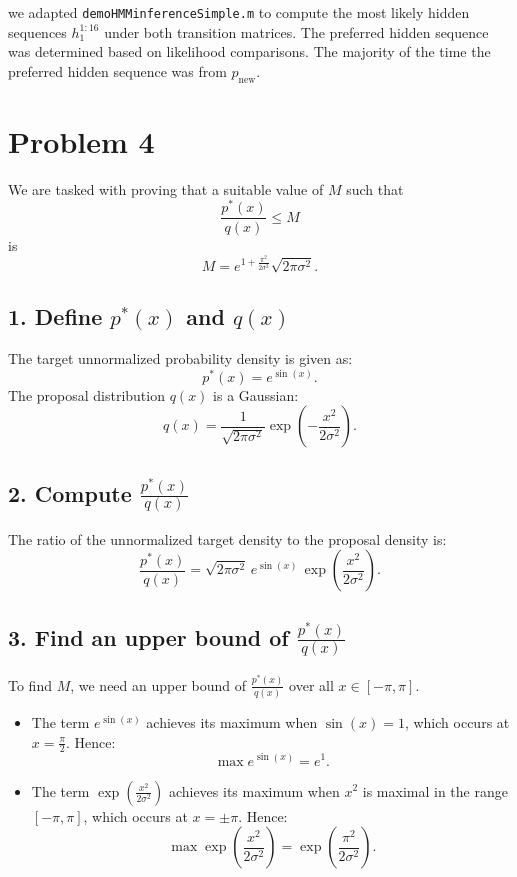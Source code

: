 \documentclass{article}
\begin{document}
we adapted \texttt{demoHMMinferenceSimple.m} to compute the most likely hidden sequences \( h_1^{1:16} \) under both transition matrices. The preferred hidden sequence was determined based on likelihood comparisons. The majority of the time the preferred hidden sequence was from \( p_{\text{new}} \).


\section*{Problem 4}

We are tasked with proving that a suitable value of \(M\) such that 
\[
\frac{p^*(x)}{q(x)} \leq M
\]
is 
\[
M = e^{1 + \frac{\pi^2}{2\sigma^2}} \sqrt{2\pi\sigma^2}.
\]

\subsection*{1. Define \(p^*(x)\) and \(q(x)\)}
The target unnormalized probability density is given as:
\[
p^*(x) = e^{\sin(x)}.
\]
The proposal distribution \(q(x)\) is a Gaussian:
\[
q(x) = \frac{1}{\sqrt{2\pi\sigma^2}} \exp\left(-\frac{x^2}{2\sigma^2}\right).
\]

\subsection*{2. Compute \(\frac{p^*(x)}{q(x)}\)}
The ratio of the unnormalized target density to the proposal density is:
\[
\frac{p^*(x)}{q(x)} = \sqrt{2\pi\sigma^2} \, e^{\sin(x)} \, \exp\left(\frac{x^2}{2\sigma^2}\right).
\]

\subsection*{3. Find an upper bound of \(\frac{p^*(x)}{q(x)}\)}
To find \(M\), we need an upper bound of \(\frac{p^*(x)}{q(x)}\) over all \(x \in [-\pi, \pi]\). 

\begin{itemize}
    \item The term \(e^{\sin(x)}\) achieves its maximum when \(\sin(x) = 1\), which occurs at \(x = \frac{\pi}{2}\). Hence:
    \[
    \max e^{\sin(x)} = e^1.
    \]

    \item The term \(\exp\left(\frac{x^2}{2\sigma^2}\right)\) achieves its maximum when \(x^2\) is maximal in the range \([- \pi, \pi]\), which occurs at \(x = \pm\pi\). Hence:
    \[
    \max \exp\left(\frac{x^2}{2\sigma^2}\right) = \exp\left(\frac{\pi^2}{2\sigma^2}\right).
    \]
\end{itemize}
\end{document}
